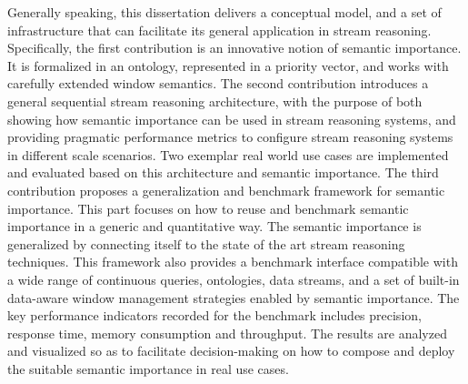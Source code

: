 Generally speaking, this dissertation delivers a conceptual model, and a set of infrastructure that can facilitate its general application in stream reasoning. 
Specifically, the first contribution is an innovative notion of semantic importance.
It is formalized in an ontology, represented in a priority vector, and works with carefully extended window semantics. 
The second contribution introduces a general sequential stream reasoning architecture, with the purpose of both showing how semantic importance can be used in stream reasoning systems, and providing pragmatic performance metrics to configure stream reasoning systems in different scale scenarios. 
Two exemplar real world use cases are implemented and evaluated based on this architecture and semantic importance.
The third contribution proposes a generalization and benchmark framework for semantic importance. 
This part focuses on how to reuse and benchmark semantic importance in a generic and quantitative way.
The semantic importance is generalized by connecting itself to the state of the art stream reasoning techniques. 
This framework also provides a benchmark interface compatible with a wide range of continuous queries, ontologies, data streams, and a set of built-in data-aware window management strategies enabled by semantic importance. 
The key performance indicators recorded for the benchmark includes precision, response time, memory consumption and throughput. 
The results are analyzed and visualized so as to facilitate decision-making on how to compose and deploy the suitable semantic importance in real use cases. 


